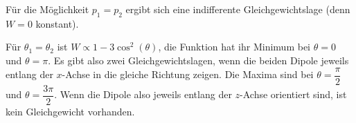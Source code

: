 \documentclass[a4paper,german,12pt,smallheadings]{scrartcl}
\begin{document}
\begin{enumerate}[a)]
    Für die Möglichkeit $p_1 = p_2$ ergibt sich eine indifferente
    Gleichgewichtslage (denn $W = 0$ konstant).

    Für $\theta_1 = \theta_2$ ist $W \propto 1 - 3 \cos^2(\theta)$, die
    Funktion hat ihr Minimum bei $\theta = 0$ und $\theta = \pi$. Es gibt also
    zwei Gleichgewichtslagen, wenn die beiden Dipole jeweils entlang der
    $x$-Achse in die gleiche Richtung zeigen. Die Maxima sind bei $\theta =
    \dfrac{\pi}{2}$ und $\theta = \dfrac{3 \pi}{2}$. Wenn die Dipole also
    jeweils entlang der $z$-Achse orientiert sind, ist kein Gleichgewicht
    vorhanden.



\end{enumerate}
\end{document}
